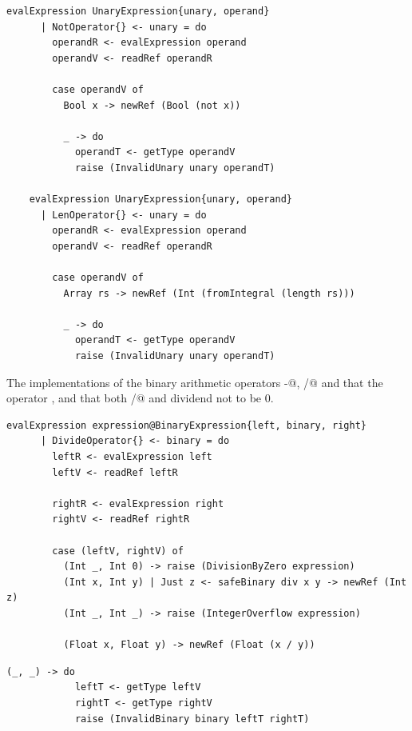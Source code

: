 \documentclass[UdineBachThesis,american,11pt]{PhdThesis}
\begin{document}
  \begin{lstlisting}[gobble=4,basicstyle=\ttfamily\small]
    evalExpression UnaryExpression{unary, operand}
      | NotOperator{} <- unary = do
        operandR <- evalExpression operand
        operandV <- readRef operandR

        case operandV of
          Bool x -> newRef (Bool (not x))

          _ -> do
            operandT <- getType operandV
            raise (InvalidUnary unary operandT)

    evalExpression UnaryExpression{unary, operand}
      | LenOperator{} <- unary = do
        operandR <- evalExpression operand
        operandV <- readRef operandR

        case operandV of
          Array rs -> newRef (Int (fromIntegral (length rs)))

          _ -> do
            operandT <- getType operandV
            raise (InvalidUnary unary operandT)
  \end{lstlisting}

  The implementations of the binary arithmetic operators \lstinline@-@,
  \lstinline@/@ and \lstinline@%@ are similar to each other, with the exception
  that the operator \lstinline@%@ supports only operands of type
  \lstinline@Int@, and that both \lstinline@/@ and \lstinline@%@ require the
  dividend not to be 0.

  \begin{lstlisting}[gobble=4,basicstyle=\ttfamily\small]
    evalExpression expression@BinaryExpression{left, binary, right}
      | DivideOperator{} <- binary = do
        leftR <- evalExpression left
        leftV <- readRef leftR

        rightR <- evalExpression right
        rightV <- readRef rightR

        case (leftV, rightV) of
          (Int _, Int 0) -> raise (DivisionByZero expression)
          (Int x, Int y) | Just z <- safeBinary div x y -> newRef (Int z)
          (Int _, Int _) -> raise (IntegerOverflow expression)

          (Float x, Float y) -> newRef (Float (x / y))
  \end{lstlisting}

  \newpage

  \begin{lstlisting}[gobble=4,basicstyle=\ttfamily\small]
          (_, _) -> do
            leftT <- getType leftV
            rightT <- getType rightV
            raise (InvalidBinary binary leftT rightT)
  \end{lstlisting}
\end{document}
